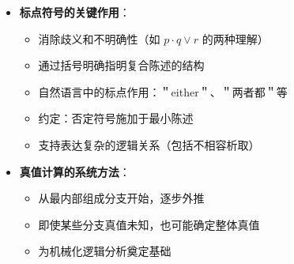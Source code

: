\begin{center}
{{\begin{itemize}
\begin{itemize}
  \item 历史语言学：拉丁语vel（相容）vs. aut（不相容）
  \item 现代逻辑选择相容析取作为标准解释
  \end{itemize}
\item \textbf{标点符号的关键作用}：
  \begin{itemize}
  \item 消除歧义和不明确性（如 $p \cdot q \vee r$ 的两种理解）
  \item 通过括号明确指明复合陈述的结构
  \item 自然语言中的标点作用：＂either＂、＂两者都＂等
  \item 约定：否定符号施加于最小陈述
  \item 支持表达复杂的逻辑关系（包括不相容析取）
  \end{itemize}
\item \textbf{真值计算的系统方法}：
  \begin{itemize}
  \item 从最内部组成分支开始，逐步外推
  \item 即使某些分支真值未知，也可能确定整体真值
  \item 为机械化逻辑分析奠定基础
  \end{itemize}
\end{itemize}
}}
\end{center}